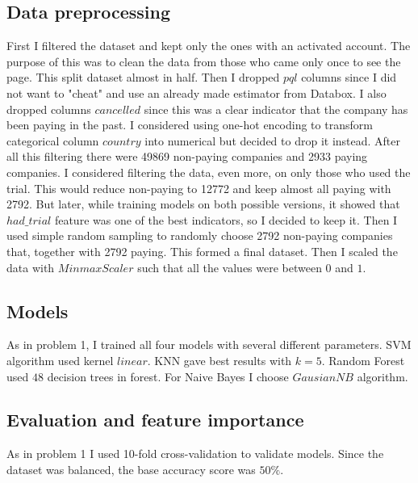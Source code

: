 \documentclass[fleqn,moreauthors,10pt]{ds_report}
\begin{document}
\subsection{Data preprocessing}
First I filtered the dataset and kept only the ones with an activated account. The purpose of this was to clean the data from those who came only once to see the page. This split dataset almost in half. Then I dropped $pql$ columns since I did not want to "cheat" and use an already made estimator from Databox. I also dropped columns $cancelled$ since this was a clear indicator that the company has been paying in the past. I considered using one-hot encoding to transform categorical column $country$ into numerical but decided to drop it instead. After all this filtering there were 49869 non-paying companies and  2933 paying companies. I considered filtering the data, even more, on only those who used the trial. This would reduce non-paying to 12772 and keep almost all paying with 2792. But later, while training models on both possible versions, it showed that $had\_trial$ feature was one of the best indicators, so I decided to keep it. Then I used simple random sampling to randomly choose 2792 non-paying companies that, together with 2792 paying. This formed a final dataset. Then I scaled the data with $MinmaxScaler$ such that all the values were between $0$ and $1$.



\subsection{Models}
As in problem 1, I trained all four models with several different parameters. SVM algorithm used kernel $linear$. KNN gave best results with $k=5$. Random Forest used $48$ decision trees in forest. For Naive Bayes I choose $GausianNB$ algorithm.


\subsection{Evaluation and feature importance}
As in problem 1 I used 10-fold cross-validation to validate models. Since the dataset was balanced, the base accuracy score was $50\%$. 
\end{document}
